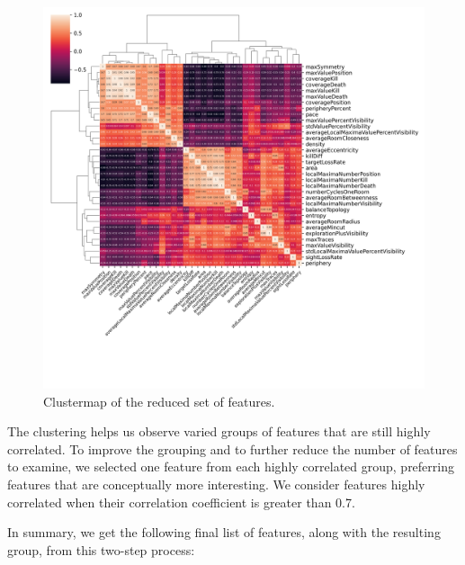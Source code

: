 \begin{figure}[hbt!]
    \centering
    \includegraphics[width=1.0\textwidth]{images/covariance_clustermap_reduced.png}
    \caption{Clustermap of the reduced set of features.}
    \label{fig:correlation_clustermap_reduced}
\end{figure}

The clustering helps us observe varied groups of features that are still highly correlated. To improve the grouping and to further reduce the number of features to examine, we selected one feature from each highly correlated group, preferring features that are conceptually more interesting. We consider features highly correlated when their correlation coefficient is greater than 0.7. 

In summary, we get the following final list of features, along with the resulting group, from this two-step process:

